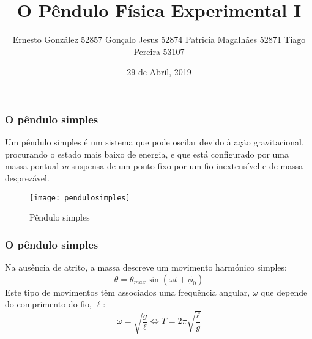 \documentclass{beamer}
\title{O Pêndulo \newline Física Experimental I}
\author{Ernesto González 52857 \newline Gonçalo Jesus 52874 \newline Patricia Magalhães 52871 \newline Tiago Pereira 53107}
\date{29 de Abril, 2019}
\begin{document}
\maketitle

\begin{frame}
	\frametitle{O pêndulo simples}
	Um pêndulo simples é um sistema que 		pode oscilar devido à ação 					gravitacional, procurando o estado mais baixo de energia, e que está 		configurado por uma massa pontual 			\textit{m} suspensa de um ponto fixo 		por um fio inextensível e de massa 			desprezável.
	\begin{figure}
		\texttt{[image: pendulosimples]}\caption{Pêndulo simples}
	\end{figure}

\end{frame}

\begin{frame}
	\frametitle{O pêndulo simples }
	Na ausência de atrito, a massa descreve um movimento harmónico simples:
	$$ \theta = \theta _{max} \sin (\omega 	t + \phi _0) $$
	Este tipo de movimentos têm associados 	uma frequência angular, $ \omega $ que 	depende do 				comprimento do fio, $ \ell 	$:
	$$ \omega = \sqrt{\frac{g}{\ell}} \iff T = 2 \pi \sqrt{\frac{\ell}{g}} $$
\end{frame}

\end{document}
